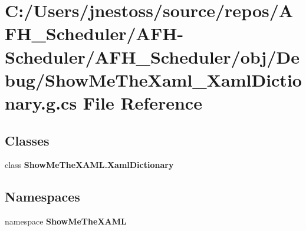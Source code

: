 \section{C\+:/\+Users/jnestoss/source/repos/\+A\+F\+H\+\_\+\+Scheduler/\+A\+F\+H-\/\+Scheduler/\+A\+F\+H\+\_\+\+Scheduler/obj/\+Debug/\+Show\+Me\+The\+Xaml\+\_\+\+Xaml\+Dictionary.g.\+cs File Reference}
\label{_debug_2_show_me_the_xaml___xaml_dictionary_8g_8cs}
\subsection*{Classes}
\begin{DoxyCompactItemize}
\item 
class {\bfseries Show\+Me\+The\+X\+A\+M\+L.\+Xaml\+Dictionary}
\end{DoxyCompactItemize}
\subsection*{Namespaces}
\begin{DoxyCompactItemize}
\item 
namespace \textbf{ Show\+Me\+The\+X\+A\+ML}
\end{DoxyCompactItemize}
